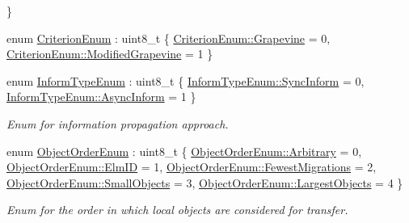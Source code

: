 \begin{DoxyCompactItemize}
 \}
\item 
enum \hyperlink{namespacevt_1_1vrt_1_1collection_1_1lb_a4e454750e102cf5404d5ac151148951c}{Criterion\+Enum} \+: uint8\+\_\+t \{ \hyperlink{namespacevt_1_1vrt_1_1collection_1_1lb_a4e454750e102cf5404d5ac151148951caa779a9fcc319cb370da5dc3a2b608721}{Criterion\+Enum\+::\+Grapevine} = 0, 
\hyperlink{namespacevt_1_1vrt_1_1collection_1_1lb_a4e454750e102cf5404d5ac151148951caf2d66de88187d7c4c75884f5605ae168}{Criterion\+Enum\+::\+Modified\+Grapevine} = 1
 \}
\item 
enum \hyperlink{namespacevt_1_1vrt_1_1collection_1_1lb_a38645ae954fc9b85e4c8f020eb0234aa}{Inform\+Type\+Enum} \+: uint8\+\_\+t \{ \hyperlink{namespacevt_1_1vrt_1_1collection_1_1lb_a38645ae954fc9b85e4c8f020eb0234aaa7228d42ce6e32b9d69a58878e39ecfa5}{Inform\+Type\+Enum\+::\+Sync\+Inform} = 0, 
\hyperlink{namespacevt_1_1vrt_1_1collection_1_1lb_a38645ae954fc9b85e4c8f020eb0234aaa1997a66729a2620d0bccf74d06bc402a}{Inform\+Type\+Enum\+::\+Async\+Inform} = 1
 \}\begin{DoxyCompactList}\small\item\em Enum for information propagation approach. \end{DoxyCompactList}
\item 
enum \hyperlink{namespacevt_1_1vrt_1_1collection_1_1lb_a3c71e131f84e2ccbb95f43a1058c749c}{Object\+Order\+Enum} \+: uint8\+\_\+t \{ \newline
\hyperlink{namespacevt_1_1vrt_1_1collection_1_1lb_a3c71e131f84e2ccbb95f43a1058c749ca3c1fc46575f79b15fc8990642387d07f}{Object\+Order\+Enum\+::\+Arbitrary} = 0, 
\hyperlink{namespacevt_1_1vrt_1_1collection_1_1lb_a3c71e131f84e2ccbb95f43a1058c749ca63d0a624ca97347ebbc3f4190b343888}{Object\+Order\+Enum\+::\+Elm\+ID} = 1, 
\hyperlink{namespacevt_1_1vrt_1_1collection_1_1lb_a3c71e131f84e2ccbb95f43a1058c749ca37b06ef260760bd7b343b29b8fb43063}{Object\+Order\+Enum\+::\+Fewest\+Migrations} = 2, 
\hyperlink{namespacevt_1_1vrt_1_1collection_1_1lb_a3c71e131f84e2ccbb95f43a1058c749caba285d85de6643804425ac332bf81193}{Object\+Order\+Enum\+::\+Small\+Objects} = 3, 
\newline
\hyperlink{namespacevt_1_1vrt_1_1collection_1_1lb_a3c71e131f84e2ccbb95f43a1058c749ca58a14656ff3b03b4af0559d79b5ac566}{Object\+Order\+Enum\+::\+Largest\+Objects} = 4
 \}\begin{DoxyCompactList}\small\item\em Enum for the order in which local objects are considered for transfer. \end{DoxyCompactList}
\item 

\end{DoxyCompactItemize}

